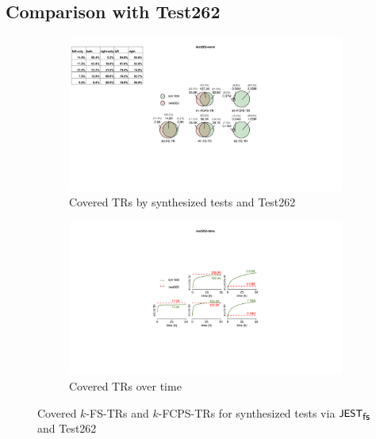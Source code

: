 
\subsection{Comparison with Test262}\label{sec:compare-test262}

\begin{figure}
  \centering
%
  \begin{subfigure}{0.49\textwidth}
    \includegraphics[width=\textwidth]{img/test262-venn}
    \caption{Covered TRs by synthesized tests and Test262}
  \end{subfigure}
%
  \begin{subfigure}{0.49\textwidth}
    \includegraphics[width=\textwidth]{img/test262-time}
    \caption{Covered TRs over time}
  \end{subfigure}
%
  \caption{Covered $k$-FS-TRs and $k$-FCPS-TRs for synthesized tests via $\textsf{\small JEST}_{\textsf{\small fs}}$ and Test262
  }
  \label{fig:test262}
\vspace*{-1em}
\end{figure}


